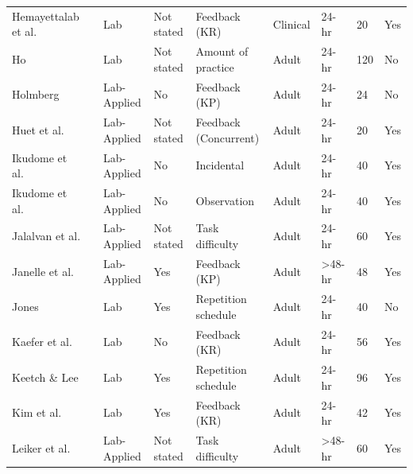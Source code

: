 \documentclass[man,floatsintext,hidelinks]{apa7}
\begin{document}
\begin{landscape}
\begin{longtable}[l]{lllllllll}
Hemayettalab et al.   & \citeyear{Hemayattalab2013-mq}           & Lab         & Not stated   & Feedback (KR)         & Clinical     & 24-hr              & 20  & Yes       \\
Ho                    & \citeyear{Ho2016-on}           & Lab         & Not stated   & Amount of practice    & Adult        & 24-hr              & 120 & No        \\
Holmberg              & \citeyear{Holmberg2013-qk}           & Lab-Applied & No           & Feedback (KP)         & Adult        & 24-hr              & 24  & No        \\
Huet et al.           & \citeyear{Huet2009-wu}           & Lab-Applied & Not stated   & Feedback (Concurrent) & Adult        & 24-hr              & 20  & Yes       \\
Ikudome et al.        & \citeyear[Exp 1]{Ikudome2019-ru}   & Lab-Applied & No           & Incidental            & Adult        & 24-hr              & 40  & Yes       \\
Ikudome et al.        & \citeyear[Exp 2]{Ikudome2019-ru}   & Lab-Applied & No           & Observation           & Adult        & 24-hr              & 40  & Yes       \\
Jalalvan et al.       & \citeyear{Jalalvand2019-im}           & Lab-Applied & Not stated   & Task difficulty       & Adult        & 24-hr              & 60  & Yes       \\
Janelle et al.        & \citeyear{Janelle1997-ht}           & Lab-Applied & Yes          & Feedback (KP)         & Adult        & \textgreater 48-hr & 48  & Yes       \\
Jones                 & \citeyear{jones2010-qw}          & Lab         & Yes          & Repetition schedule   & Adult        & 24-hr              & 40  & No        \\
Kaefer et al.         & \citeyear{Kaefer2014-bs}           & Lab         & No           & Feedback (KR)         & Adult        & 24-hr              & 56  & Yes       \\
Keetch \& Lee         & \citeyear{Keetch2007-yp}           & Lab         & Yes          & Repetition schedule   & Adult        & 24-hr              & 96  & Yes       \\
Kim et al.            & \citeyear{Kim2019-sl}           & Lab         & Yes          & Feedback (KR)         & Adult        & 24-hr              & 42  & Yes       \\
Leiker et al. 		  & \citeyear{Leiker2016-zd}      	  & Lab-Applied & Not stated & Task difficulty & Adult & \textgreater 48-hr & 60 & Yes \\

\end{longtable}
\end{landscape}
\end{document}
